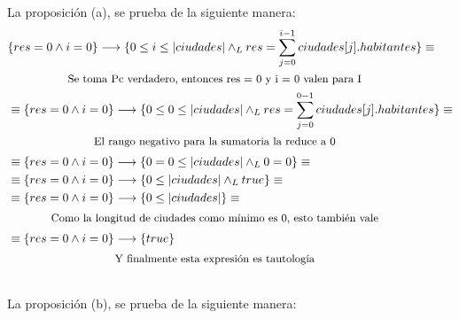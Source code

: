 \documentclass[50pt,a4paper]{article}
\newcommand{\invariante}[1]{0 \leq #1 \leq |ciudades| \yLuego res = \sum\limits_{j=0}^{#1 - 1} ciudades[j].habitantes}
\begin{document}
\indent
La proposición (a), se prueba de la siguiente manera:
\begin{align*}  %
    &\{ res = 0 \land i = 0 \} \implica \{\invariante{i}\} \equiv \\
    \shortintertext{\parbox{\textwidth}{\centering \small {Se toma Pc verdadero, entonces res = 0 y i = 0 valen para I}}} \notag
    &\equiv\{ res = 0 \land i = 0 \} \implica \{ \invariante{0} \} \equiv\\
    \shortintertext{\parbox{\textwidth}{\centering \small {El rango negativo para la sumatoria la reduce a 0}}} \notag
    &\equiv\{ res = 0 \land i = 0 \} \implica \{ 0 = 0 \leq |ciudades| \yLuego 0 = 0 \} \equiv\\
    &\equiv\{ res = 0 \land i = 0 \} \implica \{ 0 \leq |ciudades| \yLuego true \} \equiv\\
    &\equiv\{ res = 0 \land i = 0 \} \implica \{ 0 \leq |ciudades| \} \equiv\\
    \shortintertext{\parbox{\textwidth}{\centering \small {Como la longitud de ciudades como mínimo es 0, esto también vale}}} \notag
    &\equiv\{ res = 0 \land i = 0 \} \implica \{ true \} \\
    \shortintertext{\parbox{\textwidth}{\centering \small {Y finalmente esta expresión es tautología}}} \notag
\end{align*}
\indent
La proposición (b), se prueba de la siguiente manera:
\end{document}

